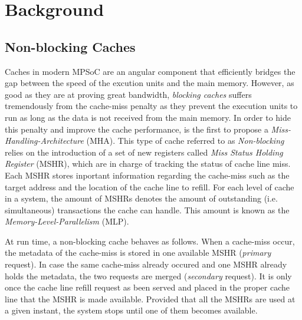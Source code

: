 \section{Background}
    \subsection{Non-blocking Caches}
        Caches in modern MPSoC are an angular component that efficiently bridges the gap between the speed of the excution units and  the main memory.
        However, as good as they are at proving great bandwidth, \emph{blocking caches} suffers tremendously from the cache-miss penalty as they prevent the execution units to run as long as the data is not received from the main memory.
        In order to hide this penalty and improve the cache performance, \cite{Kroft} is the first to propose a \emph{Miss-Handling-Architecture} (MHA).
        This type of cache referred to as \emph{Non-blocking} relies on the introduction of a set of new registers called \emph{Miss Status Holding Register} (MSHR), which are in charge of tracking the status of cache line miss.
        Each MSHR stores inportant information regarding the cache-miss such as the target address and the location of the cache line to refill.
        For each level of cache in a system, the amount of MSHRs denotes the amount of outstanding (i.e. simultaneous) transactions the cache can handle.
        This amount is known as the \emph{Memory-Level-Parallelism} (MLP).

        At run time, a non-blocking cache behaves as follows. When a cache-miss occur, the metadata of the cache-miss is stored in one available MSHR (\emph{primary} request). In case the same cache-miss already occured and one MSHR already holds the metadata, the two requests are merged (\emph{secondary} request). It is only once the cache line refill request as been served and placed in the proper cache line that the MSHR is made available. Provided that all the MSHRs are used at a given instant, the system stops until one of them becomes available.

